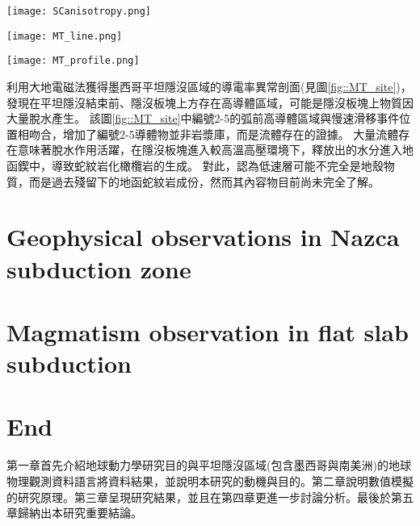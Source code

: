 \begin{figure*}[ht!]
    \centering
    \texttt{[image: SCanisotropy.png]}
    \caption{墨西哥隱沒帶板塊介面附近剪切帶結構示意圖(\citealp{Song2012SC}
    )。大地震主要發生在鎖定區(locked zone)和脆性(brittle)變形區域。慢速滑移事件(slow-slip event)主要發生在過渡帶(transition zone)和半韌性區域(seni-ductile regime)，Vs非常低，且非均向性極強。岩石流變轉換由350$^{\circ}$等溫線(淺藍色線)分開，導致應力梯度形成且方向與黏土礦物中流體壓力相反，導致低速帶的形成。這些低速帶流體導致板塊介面處於低耦合狀態，並且主導該地區慢速滑移事件的生成。
    }
    \label{fig::SCanisotorpy2012}
\end{figure*}

\begin{figure*}[ht!]
    \centering
    \texttt{[image: MT\_line.png]}
    \caption{\citealp{MT2006}中所使用的大地電磁剖面位置圖，本研究僅使用BB'剖面。
    }
    \label{fig::MT_site}
\end{figure*}

\begin{figure*}[ht!]
    \centering
    \texttt{[image: MT\_profile.png]}
    \caption{墨西哥平坦隱沒區域的導電率異常剖面圖與解釋圖，摘自\citealp{MT2006}。上圖為電阻率異常結果剖面，所繪之隱沒板塊位置參考自\citealp{pardo1995}結果，最上方標示跨墨西哥火山帶的範圍。圖中每個數字圈皆代表隱沒帶上岩石發生向變後脫水的位置。下圖為電阻異常解釋圖，綠色區域為電阻異常低區(<100 $\Omega m$)。在平坦隱沒段結束處有多個岩石相變事件發生，隱沒板塊上出現大範圍導體。
    }
    \label{fig::MT_profile}
\end{figure*}

\citealp{MT2006}利用大地電磁法獲得墨西哥平坦隱沒區域的導電率異常剖面(見圖\ref{fig::MT_site})，發現在平坦隱沒結束前、隱沒板塊上方存在高導體區域，可能是隱沒板塊上物質因大量脫水產生。
該圖\ref{fig::MT_site}中編號2-5的弧前高導體區域與慢速滑移事件位置相吻合，增加了編號2-5導體物並非岩漿庫，而是流體存在的證據。
大量流體存在意味著脫水作用活躍，在隱沒板塊進入較高溫高壓環境下，釋放出的水分進入地函鍥中，導致蛇紋岩化橄欖岩的生成。
對此，\citealp{Manea2013}認為低速層可能不完全是地殼物質，而是過去殘留下的地函蛇紋岩成份，然而其內容物目前尚未完全了解。

\section{Geophysical observations in Nazca subduction zone}

\section{Magmatism observation in flat slab subduction}

\section{End}
第一章首先介紹地球動力學研究目的與平坦隱沒區域(包含墨西哥與南美洲)的地球物理觀測資料語言將資料結果，並說明本研究的動機與目的。第二章說明數值模擬的研究原理。第三章呈現研究結果，並且在第四章更進一步討論分析。最後於第五章歸納出本研究重要結論。
